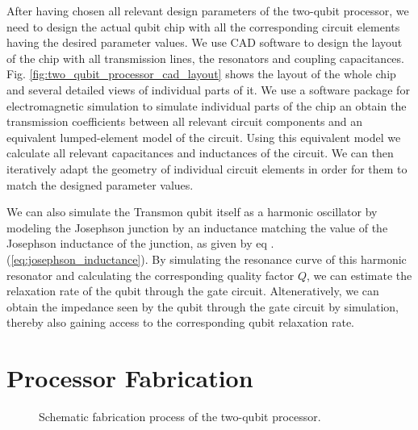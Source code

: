 After having chosen all relevant design parameters of the two-qubit processor, we need to design the actual qubit chip with all the corresponding circuit elements having the desired parameter values. We use CAD software to design the layout of the chip with all transmission lines, the resonators and coupling capacitances. Fig. \ref{fig:two_qubit_processor_cad_layout} shows the layout of the whole chip and several detailed views of individual parts of it. We use a software package for electromagnetic simulation \citep{} to simulate individual parts of the chip an obtain the transmission coefficients between all relevant circuit components and an equivalent lumped-element model of the circuit. Using this equivalent model we calculate all relevant capacitances and inductances of the circuit. We can then iteratively adapt the geometry of individual circuit elements in order for them to match the designed parameter values.

\smallskip

We can also simulate the Transmon qubit itself as a harmonic oscillator by modeling the Josephson junction by an inductance matching the value of the Josephson inductance of the junction, as given by eq .(\ref{eq:josephson_inductance}). By simulating the resonance curve of this harmonic resonator and calculating the corresponding quality factor $Q$, we can estimate the relaxation rate of the qubit through the gate circuit. Alteneratively, we can obtain the impedance seen by the qubit through the gate circuit by simulation, thereby also gaining access to the corresponding qubit relaxation rate.

\section{Processor Fabrication}

\begin{figure}[ht!]
	\centering
	\caption[]{Schematic  fabrication process of the two-qubit processor.}
	\label{fig:processor_fabrication}
\end{figure}


